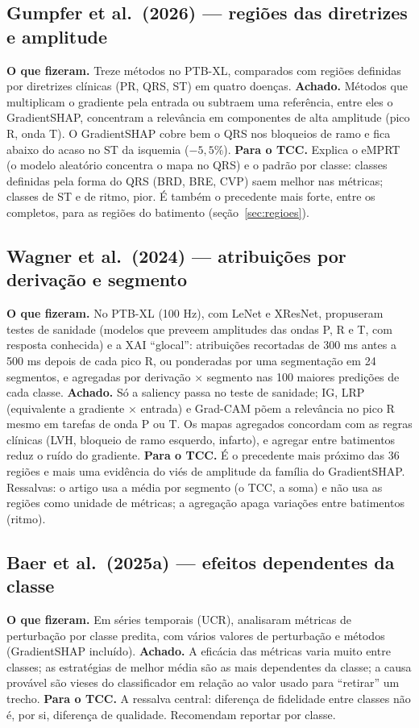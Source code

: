 \documentclass[11pt,a4paper]{article}
\begin{document}
\subsection{Gumpfer et al.\ (2026) — regiões das diretrizes e amplitude}
\textbf{O que fizeram.} Treze métodos no PTB-XL, comparados com regiões definidas por diretrizes clínicas (PR, QRS, ST) em quatro doenças. \textbf{Achado.} Métodos que multiplicam o gradiente pela entrada ou subtraem uma referência, entre eles o GradientSHAP, concentram a relevância em componentes de alta amplitude (pico R, onda T). O GradientSHAP cobre bem o QRS nos bloqueios de ramo e fica abaixo do acaso no ST da isquemia ($-5{,}5\%$). \textbf{Para o TCC.} Explica o eMPRT (o modelo aleatório concentra o mapa no QRS) e o padrão por classe: classes definidas pela forma do QRS (BRD, BRE, CVP) saem melhor nas métricas; classes de ST e de ritmo, pior. É também o precedente mais forte, entre os completos, para as regiões do batimento (seção~\ref{sec:regioes}).

\subsection{Wagner et al.\ (2024) — atribuições por derivação e segmento}
\textbf{O que fizeram.} No PTB-XL (100 Hz), com LeNet e XResNet, propuseram testes de sanidade (modelos que preveem amplitudes das ondas P, R e T, com resposta conhecida) e a XAI ``glocal'': atribuições recortadas de 300 ms antes a 500 ms depois de cada pico R, ou ponderadas por uma segmentação em 24 segmentos, e agregadas por derivação × segmento nas 100 maiores predições de cada classe. \textbf{Achado.} Só a saliency passa no teste de sanidade; IG, LRP (equivalente a gradiente × entrada) e Grad-CAM põem a relevância no pico R mesmo em tarefas de onda P ou T. Os mapas agregados concordam com as regras clínicas (LVH, bloqueio de ramo esquerdo, infarto), e agregar entre batimentos reduz o ruído do gradiente. \textbf{Para o TCC.} É o precedente mais próximo das 36 regiões e mais uma evidência do viés de amplitude da família do GradientSHAP. Ressalvas: o artigo usa a média por segmento (o TCC, a soma) e não usa as regiões como unidade de métricas; a agregação apaga variações entre batimentos (ritmo).

\subsection{Baer et al.\ (2025a) — efeitos dependentes da classe}
\textbf{O que fizeram.} Em séries temporais (UCR), analisaram métricas de perturbação por classe predita, com vários valores de perturbação e métodos (GradientSHAP incluído). \textbf{Achado.} A eficácia das métricas varia muito entre classes; as estratégias de melhor média são as mais dependentes da classe; a causa provável são vieses do classificador em relação ao valor usado para ``retirar'' um trecho. \textbf{Para o TCC.} A ressalva central: diferença de fidelidade entre classes não é, por si, diferença de qualidade. Recomendam reportar por classe.
\end{document}
